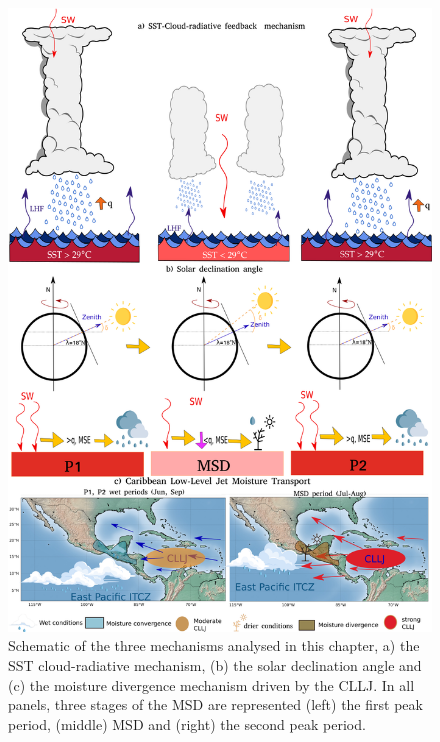  \begin{figure}[t!]
 \centering
\includegraphics[width=0.8205\linewidth]{figures/msd_all_schematics.png}
\caption[Schematics of MSD mechanisms.]{Schematic of the three mechanisms analysed in this chapter, a) the SST cloud-radiative mechanism, (b) the solar declination angle and (c) the moisture divergence mechanism driven by the CLLJ. In all panels, three stages of the MSD are represented (left) the first peak period, (middle) MSD and (right) the second peak period.}
\label{fig:schematic_msd}
\end{figure} 
 


